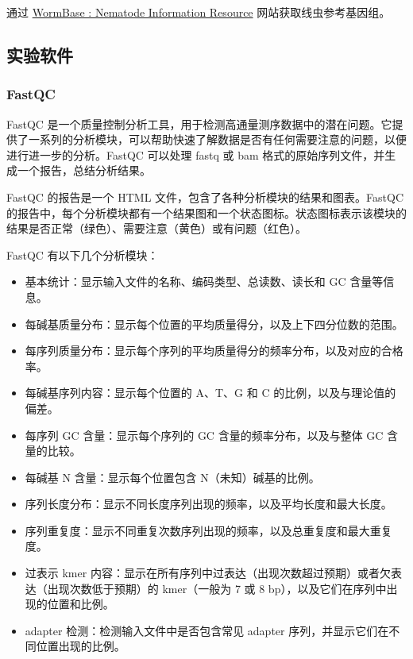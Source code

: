 \documentclass[UTF8]{ctexart}
\begin{document}
通过 \href{https://wormbase.org/}{WormBase : Nematode Information Resource} 网站获取线虫参考基因组。

\subsection{实验软件}

\subsubsection{FastQC}

FastQC 是一个质量控制分析工具，用于检测高通量测序数据中的潜在问题。它提供了一系列的分析模块，可以帮助快速了解数据是否有任何需要注意的问题，以便进行进一步的分析。FastQC 可以处理 fastq 或 bam 格式的原始序列文件，并生成一个报告，总结分析结果。

FastQC 的报告是一个 HTML 文件，包含了各种分析模块的结果和图表。FastQC 的报告中，每个分析模块都有一个结果图和一个状态图标。状态图标表示该模块的结果是否正常（绿色）、需要注意（黄色）或有问题（红色）。

FastQC 有以下几个分析模块：

\begin{itemize}
	\item 基本统计：显示输入文件的名称、编码类型、总读数、读长和 GC 含量等信息。
	\item 每碱基质量分布：显示每个位置的平均质量得分，以及上下四分位数的范围。
	\item 每序列质量分布：显示每个序列的平均质量得分的频率分布，以及对应的合格率。
	\item 每碱基序列内容：显示每个位置的 A、T、G 和 C 的比例，以及与理论值的偏差。
	\item 每序列 GC 含量：显示每个序列的 GC 含量的频率分布，以及与整体 GC 含量的比较。
	\item 每碱基 N 含量：显示每个位置包含 N（未知）碱基的比例。
	\item 序列长度分布：显示不同长度序列出现的频率，以及平均长度和最大长度。
	\item 序列重复度：显示不同重复次数序列出现的频率，以及总重复度和最大重复度。
	\item 过表示 kmer 内容：显示在所有序列中过表达（出现次数超过预期）或者欠表达（出现次数低于预期）的 kmer（一般为 7 或 8 bp），以及它们在序列中出现的位置和比例。
	\item adapter 检测：检测输入文件中是否包含常见 adapter 序列，并显示它们在不同位置出现的比例。
	
\end{itemize}
\end{document}
